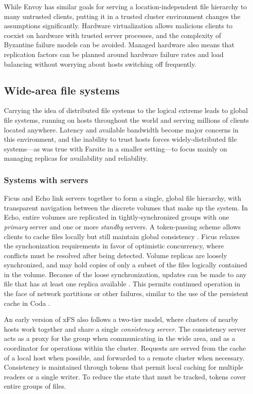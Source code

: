 While Envoy has similar goals for serving a location-independent file hierarchy to many untrusted clients, putting it in a trusted cluster environment changes the assumptions significantly. Hardware virtualization allows malicious clients to coexist on hardware with trusted server processes, and the complexity of Byzantine failure models can be avoided. Managed hardware also means that replication factors can be planned around hardware failure rates and load balancing without worrying about hosts switching off frequently.

\subsection{Wide-area file systems}

Carrying the idea of distributed file systems to the logical extreme leads to global file systems, running on hosts throughout the world and serving millions of clients located anywhere. Latency and available bandwidth become major concerns in this environment, and the inability to trust hosts forces widely-distributed file systems---as was true with Farsite in a smaller setting---to focus mainly on managing replicas for availability and reliability.

\subsubsection{Systems with servers}

Ficus \cite{guy} and Echo \cite{birrell93} link servers together to form a single, global file hierarchy, with transparent navigation between the discrete volumes that make up the system. In Echo, entire volumes are replicated in tightly-synchronized groups with one \emph{primary} server and one or more \emph{standby} servers. A token-passing scheme allows clients to cache files locally but still maintain global consistency \cite{mann}. Ficus relaxes the synchonization requirements in favor of optimistic concurrency, where conflicts must be resolved after being detected. Volume replicas are loosely synchronized, and may hold copies of only a subset of the files logically contained in the volume. Because of the loose synchronization, updates can be made to any file that has at least one replica available \cite{popek}. This permits continued operation in the face of network partitions or other failures, similar to the use of the persistent cache in Coda \cite{kistler}.

An early version of xFS \cite{wang93} also follows a two-tier model, where clusters of nearby hosts work together and share a single \emph{consistency server}. The consistency server acts as a proxy for the group when communicating in the wide area, and as a coordinator for operations within the cluster. Requests are served from the cache of a local host when possible, and forwarded to a remote cluster when necessary. Consistency is maintained through tokens that permit local caching for multiple readers or a single writer. To reduce the state that must be tracked, tokens cover entire groups of files.

